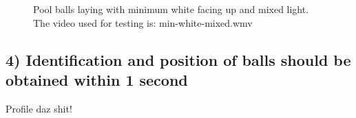 
\begin{figure}[H]
  \centering
  \quad
  \quad
   \caption{Pool balls laying with minimum white facing up and mixed light. The video used for testing is: min-white-mixed.wmv}
  \label{fig:minmixed}
\end{figure}


\subsection{4) Identification and position of balls should be obtained within 1 second}

Profile daz shit!
